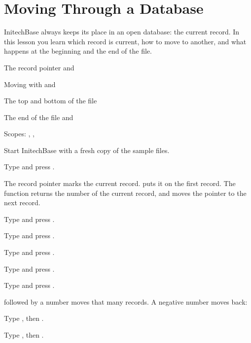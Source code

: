 \chapter{Moving Through a Database}
InitechBase always keeps its place in an open database: the current record.
In this lesson you learn which record is current, how to move to another, and
what happens at the beginning and the end of the file.

\begin{ChapterCovers}
\item The record pointer and 
\item Moving with  and 
\item The top and bottom of the file
\item The end of the file and 
\item Scopes: , , 
\end{ChapterCovers}

Start InitechBase with a fresh copy of the sample files.
\begin{Steps}
\item Type  and press .
\end{Steps}

The record pointer marks the current record.   puts it on the first
record.  The function  returns the number of the current record,
and  moves the pointer to the next record.
\begin{Steps}[resume]
\item Type  and press .
\item Type  and press .
\item Type  and press .
\item Type  and press .
\item Type  and press .
\end{Steps}
 followed by a number moves that many records.  A negative number
moves back:
\begin{Steps}[resume]
\item Type , then .
\item Type , then .
\end{Steps}

